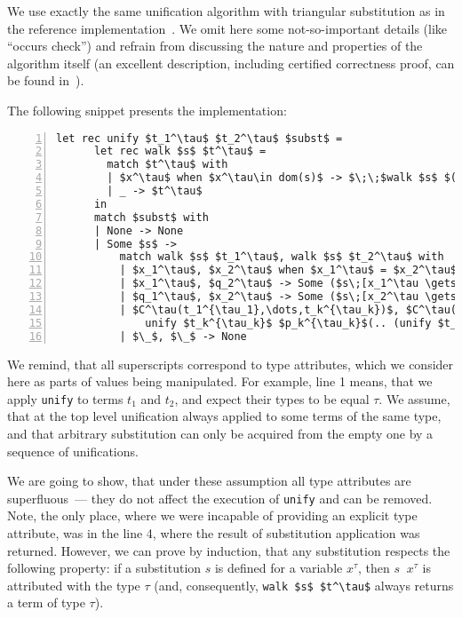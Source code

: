 We use exactly the same unification algorithm with triangular substitution as in the reference implementation~\cite{MicroKanren}. We
omit here some not-so-important details (like ``occurs check'') and refrain from discussing the nature and properties of the algorithm
itself (an excellent description, including certified correctness proof, can be found in~\cite{Kumar}).

The following snippet presents the implementation:

\begin{lstlisting}[mathescape=true,numbers=left,numberstyle=\small,stepnumber=1,numbersep=-5pt]
    let rec unify $t_1^\tau$ $t_2^\tau$ $subst$ = 
      let rec walk $s$ $t^\tau$ = 
        match $t^\tau$ with
        | $x^\tau$ when $x^\tau\in dom(s)$ -> $\;\;$walk $s$ $(s\;\;x^\tau)$
        | _ -> $t^\tau$
      in
      match $subst$ with
      | None -> None
      | Some $s$ ->
          match walk $s$ $t_1^\tau$, walk $s$ $t_2^\tau$ with
          | $x_1^\tau$, $x_2^\tau$ when $x_1^\tau$ = $x_2^\tau$ -> $subst$
          | $x_1^\tau$, $q_2^\tau$ -> Some ($s\;[x_1^\tau \gets q_2^\tau]$)
          | $q_1^\tau$, $x_2^\tau$ -> Some ($s\;[x_2^\tau \gets q_1^\tau]$)
          | $C^\tau(t_1^{\tau_1},\dots,t_k^{\tau_k})$, $C^\tau(p_1^{\tau_1},\dots,p_k^{\tau_k})$ -> 
              unify $t_k^{\tau_k}$ $p_k^{\tau_k}$(.. (unify $t_1^{\tau_1}$ $p_1^{\tau_1}$ $subst$)$..$)
          | $\_$, $\_$ -> None
\end{lstlisting}

We remind, that all superscripts correspond to type attributes, which we consider here as 
parts of values being manipulated. For example, line 1 means, that we apply \lstinline{unify}
to terms $t_1$ and $t_2$, and expect their types to be equal $\tau$. We assume, that 
at the top level unification always applied to some terms of the same type, and that arbitrary
substitution can only be acquired from the empty one by a sequence of unifications.

We are going to show, that under these assumption all type attributes are superfluous~--- they
do not affect the execution of \lstinline{unify} and can be removed. Note, the only place, where we
were incapable of providing an explicit type attribute, was in the line 4, where the result of
substitution application was returned. However, we can prove by induction, that any substitution 
respects the following property: if a substitution $s$ is defined for a variable $x^\tau$,
then $s\;\;x^\tau$ is attributed with the type $\tau$ (and, consequently, \lstinline{walk $s$ $t^\tau$} always
returns a term of type $\tau$).

